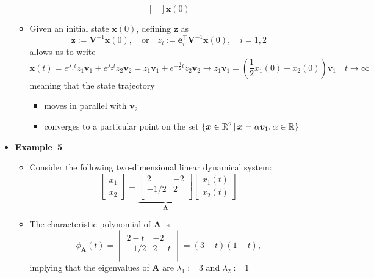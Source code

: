 \documentclass[12pt,a4paper]{article}
\begin{document}
\begin{itemize}
\begin{itemize}
\begin{equation}
\begin{bmatrix}
      \end{bmatrix}
      \bm{x}(0)
      \end{equation}
    \item Given an initial state $\bm{x}(0)$,
      defining $\bm{z}$ as
      \begin{equation}\nonumber%
        \bm{z} := \bm{V}^{-1}\bm{x}(0),
        \quad\text{or}\quad
        z_{i} := \bm{e}_{i}^{\top}\bm{V}^{-1}\bm{x}(0),
        \quad i = 1, 2
      \end{equation}
      allows us to write
    \begin{equation}\nonumber%
      \bm{x}(t)
      =
      e^{\lambda_{1}t}z_{1}\bm{v}_{1}
      +
      e^{\lambda_{2}t}z_{2}\bm{v}_{2}
      =
      z_{1}\bm{v}_{1}
      +
      e^{-\frac{1}{2}t}z_{2}\bm{v}_{2}
      \to
      z_{1}\bm{v}_{1}
      =
      \left(\frac{1}{2}x_{1}(0) - x_{2}(0)\right)\bm{v}_{1}
      \quad t \to \infty
    \end{equation}
    meaning that the state trajectory
    \begin{itemize}
    \item moves in parallel with $\bm{v}_{2}$
    \item converges to a particular point on the set $\{\bm{x}\in \mathbb{R}^{2}\,|\, \bm{x}=\alpha \bm{v}_{1}, \alpha \in \mathbb{R}\}$
    \end{itemize}
    
  \end{itemize}

\clearpage
\item \textbf{Example~5}
  \begin{itemize}
  \item Consider the following two-dimensional linear dynamical system:
    \begin{equation}\nonumber%
      \begin{bmatrix}
        \dot{x}_{1} \\
        \dot{x}_{2}
      \end{bmatrix}
      =
      \underbrace{
      \begin{bmatrix}
        2 & -2 \\
        -1/2 & 2 \\
      \end{bmatrix}}_{\bm{A}}
      \begin{bmatrix}
        x_{1}(t) \\
        x_{2}(t)
      \end{bmatrix}
    \end{equation}
  \item The characteristic polynomial of $\bm{A}$ is
    \begin{equation}\nonumber%
      \phi_{\bm{A}}(t) = 
      \begin{vmatrix}
        2 - t & -2 \\
        -1/2 & 2 - t \\
      \end{vmatrix}
      = (3-t)(1-t),
    \end{equation}
    implying that
    the eigenvalues of $\bm{A}$ are $\lambda_{1}:=3$ and $\lambda_{2}:=1$


\end{itemize}
\end{itemize}
\end{document}
